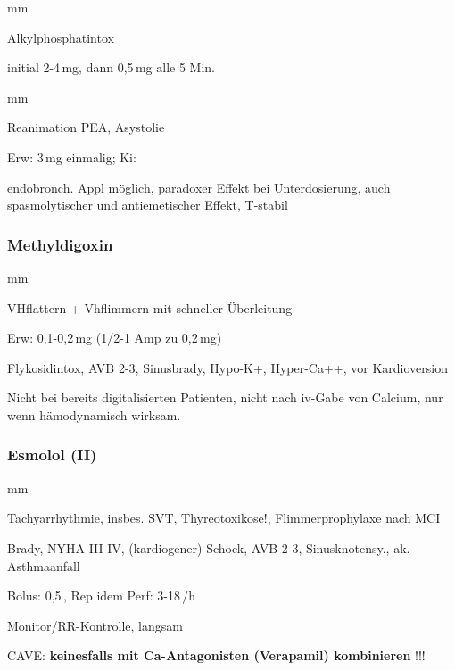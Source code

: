 \begin{labeling}[:]{mm}
  \item[In]
  \item[KI] Alkylphosphatintox
  \item[Rx] initial 2-4\,mg, dann 0,5\,mg alle 5 Min.
\end{labeling}

\begin{labeling}[:]{mm}
  \item[In] Reanimation PEA, Asystolie
  \item[Rx] Erw: 3\,mg einmalig; Ki: 
  
  \item[An] endobronch. Appl möglich, paradoxer Effekt bei Unterdosierung, auch
  spasmolytischer und antiemetischer Effekt, T{\textdegree}-stabil
  
\end{labeling}

\subsubsection{Methyldigoxin}


\begin{labeling}[:]{mm}
\item[In] VHflattern + Vhflimmern mit schneller
Überleitung

\item[Rx] Erw: 0,1-0,2\,mg (1/2-1 Amp zu 0,2\,mg)

\item[KI]  Flykosidintox, AVB 2-3{\textdegree}, Sinusbrady,
Hypo-K+, Hyper-Ca++, vor Kardioversion

{
Nicht bei bereits digitalisierten Patienten, nicht nach iv-Gabe von
Calcium, nur wenn hämodynamisch wirksam.}

\end{labeling}

\subsubsection{Esmolol (\textrm{II})}


\begin{labeling}[:]{mm}
\item[In]Tachyarrhythmie, insbes. SVT,
Thyreotoxikose!, Flimmerprophylaxe nach MCI


\item[KI]  Brady, NYHA III-IV, (kardiogener) Schock, AVB
2{\textdegree}-3{\textdegree}, Sinusknotensy., ak. Asthmaanfall


\item[Rx] Bolus: 0,5\,, Rep idem\newline
Perf: 3-18\,/h

{
Monitor/RR-Kontrolle, langsam}


CAVE: \textbf{keinesfalls mit Ca-Antagonisten (Verapamil) kombinieren}
!!!

\end{labeling}

